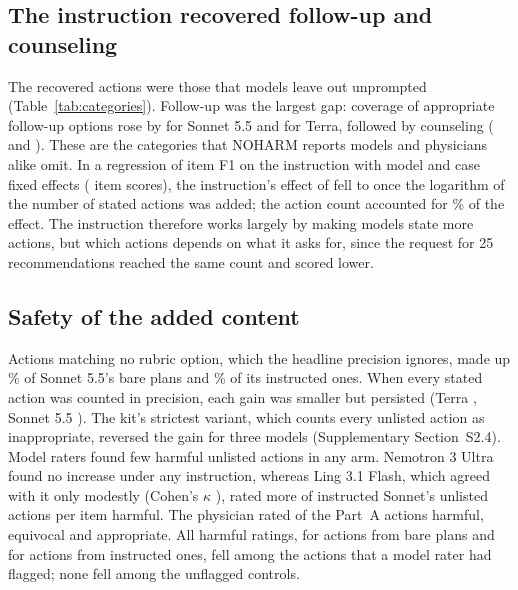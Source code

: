 \documentclass[11pt]{article}
\begin{document}
\subsection*{The instruction recovered follow-up and counseling}
\label{sec:mechanism}
\label{sec:length}
The recovered actions were those that models leave out unprompted (Table~\ref{tab:categories}).
Follow-up was the largest gap: coverage of appropriate follow-up options rose by
\covCovFollowSonnetDiff{} for Sonnet 5.5 and \covCovFollowTerraDiff{} for Terra, followed by
counseling (\covCovCounsSonnetDiff{} and \covCovCounsTerraDiff{}). These are the categories that
NOHARM reports models and physicians alike omit.\citep{wu2025noharm} In a regression of item F1 on
the instruction with model and case fixed effects (\covAdjRows{} item scores), the instruction's
effect of \covAdjTotal{} fell to \covAdjDirect{} once the logarithm of the number of stated actions
was added; the action count accounted for \covAdjShare\% \covAdjShareCI{} of the effect. The
instruction therefore works largely by making models state more actions, but which actions depends
on what it asks for, since the request for 25 recommendations reached the same count and scored
lower.

\begin{table}[htbp]
\centering\small
\caption{Share of the specialists' appropriate options (rated 7--9) covered, bare $\to$
instructed, by rubric category, primary evaluator; and options the specialists rated harmful (1--3)
that the plans proposed, per item. Procedure (4 appropriate options) is counted in ``all'';
contingency (one option) is not reported.}
\label{tab:categories}
\setlength{\tabcolsep}{3pt}

\end{table}

\subsection*{Safety of the added content}
\label{sec:safety}
Actions matching no rubric option, which the headline precision ignores, made up
\covOffSonnetBare\% of Sonnet 5.5's bare plans and \covOffSonnetSpec\% of its instructed ones. When
every stated action was counted in precision, each gain was smaller but persisted (Terra
\covDAllPromptTerra{}, Sonnet 5.5 \covDAllPromptSonnet{}). The kit's strictest variant, which counts
every unlisted action as inappropriate, reversed the gain for three models (Supplementary
Section~S2.4). Model raters found few harmful unlisted actions in any arm. Nemotron 3
Ultra found no increase under any instruction, whereas Ling 3.1 Flash, which agreed with it only
modestly (Cohen's $\kappa$ \covAuditKappaSonnet{}), rated \covAuditHarmDiffSonnetLing{} more of
instructed Sonnet's unlisted actions per item harmful. The physician rated \covPhysInappropriate{}
of the \covPhysActions{} Part~A actions harmful, \covPhysEquivocal{} equivocal and
\covPhysAppropriate{} appropriate. All \covPhysInappropriate{} harmful ratings, \covPhysInappropriateBare{} for actions
from bare plans and \covPhysInappropriatePrompt{} for actions from instructed ones, fell among the
\covPhysFlagged{} actions that a model rater had flagged; none fell among the \covPhysControls{}
unflagged controls.
\end{document}

